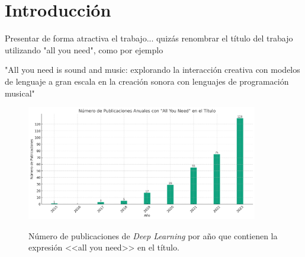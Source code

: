 \chapter{Introducción}

Presentar de forma atractiva el trabajo... quizás renombrar el título del trabajo utilizando "all you need", como por ejemplo 

"All you need is sound and music: explorando la interacción creativa con modelos de lenguaje a gran escala en la creación sonora con lenguajes de programación musical"




\begin{figure}[H]
    \caption[Número de publicaciones de \textit{Deep Learning} por año que contienen la expresión <<all you need>> en el título]{Número de publicaciones de \textit{Deep Learning} por año que contienen la expresión <<all you need>> en el título.}
    \centering
    \includegraphics[width=0.9\textwidth]{./figuras/all_you_need_publicacionies_anuales.png}
    \label{fig:all_you_need_publicaciones}
\end{figure}




